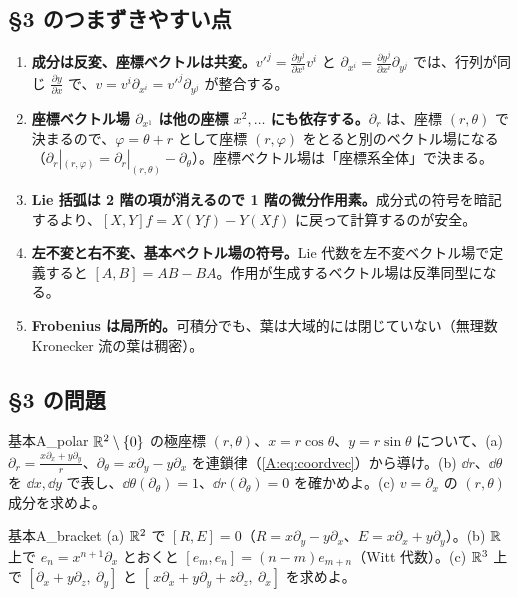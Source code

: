 \subsection*{§3 のつまずきやすい点}
\begin{enumerate}
\item \textbf{成分は反変、座標ベクトルは共変。}\mbox{$v'^j=\frac{\partial y^j}{\partial x^i}v^i$} と \mbox{$\partial_{x^i}=\frac{\partial y^j}{\partial x^i}\partial_{y^j}$} では、行列が同じ $\frac{\partial y}{\partial x}$ で、$v=v^i\partial_{x^i}=v'^j\partial_{y^j}$ が整合する。
\item \textbf{座標ベクトル場 $\partial_{x^1}$ は他の座標 $x^2,\dots$ にも依存する。}$\partial_r$ は、座標 $(r,\theta)$ で決まるので、$\varphi=\theta+r$ として座標 $(r,\varphi)$ をとると別のベクトル場になる（$\partial_r|_{(r,\varphi)}=\partial_r|_{(r,\theta)}-\partial_\theta$）。座標ベクトル場は「座標系全体」で決まる。
\item \textbf{Lie 括弧は 2 階の項が消えるので 1 階の微分作用素。}成分式の符号を暗記するより、$[X,Y]f=X(Yf)-Y(Xf)$ に戻って計算するのが安全。
\item \textbf{左不変と右不変、基本ベクトル場の符号。}Lie 代数を左不変ベクトル場で定義すると $[A,B]=AB-BA$。作用が生成するベクトル場は反準同型になる。
\item \textbf{Frobenius は局所的。}可積分でも、葉は大域的には閉じていない（無理数 Kronecker 流の葉は稠密）。
\end{enumerate}

\subsection*{§3 の問題}
\begin{probl}{基本}{A_polar}
$\mathbb R^2\setminus\{0\}$ の極座標 $(r,\theta)$、$x=r\cos\theta$、$y=r\sin\theta$ について、(a) $\partial_r=\frac{x\partial_x+y\partial_y}{r}$、$\partial_\theta=x\partial_y-y\partial_x$ を連鎖律（\eqref{A:eq:coordvec}）から導け。(b) $\dd r$、$\dd\theta$ を $\dd x,\dd y$ で表し、$\dd\theta(\partial_\theta)=1$、$\dd r(\partial_\theta)=0$ を確かめよ。(c) $v=\partial_x$ の $(r,\theta)$ 成分を求めよ。
\end{probl}

\begin{probl}{基本}{A_bracket}
(a) $\mathbb R^2$ で $[R,E]=0$（$R=x\partial_y-y\partial_x$、$E=x\partial_x+y\partial_y$）。(b) $\mathbb R$ 上で $e_n=x^{n+1}\partial_x$ とおくと $[e_m,e_n]=(n-m)e_{m+n}$（Witt 代数）。(c) $\mathbb R^3$ 上で $[\partial_x+y\partial_z,\ \partial_y]$ と $[\,x\partial_x+y\partial_y+z\partial_z,\ \partial_x]$ を求めよ。
\end{probl}


